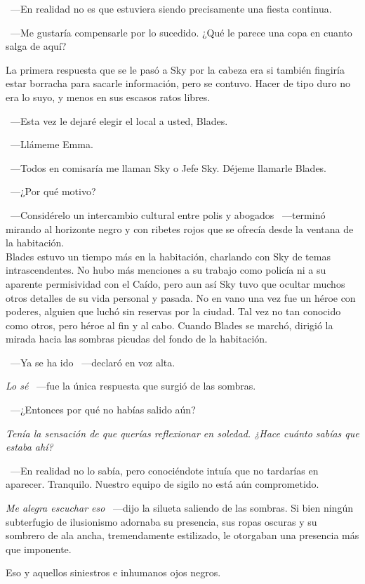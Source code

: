~---En realidad no es que estuviera siendo precisamente una fiesta continua.

~---Me gustaría compensarle por lo sucedido. ¿Qué le parece una copa en cuanto salga de aquí?

La primera respuesta que se le pasó a Sky por la cabeza era si también fingiría estar borracha para sacarle información, pero se contuvo. Hacer de tipo duro no era lo suyo, y menos en sus escasos ratos libres.

~---Esta vez le dejaré elegir el local a usted, Blades.

~---Llámeme Emma.

~---Todos en comisaría me llaman Sky o Jefe Sky. Déjeme llamarle Blades.

~---¿Por qué motivo?

~---Considérelo un intercambio cultural entre polis y abogados ~---terminó mirando al horizonte negro y con ribetes rojos que se ofrecía desde la ventana de la habitación.\\

\noindent{}Blades estuvo un tiempo más en la habitación, charlando con Sky de temas intrascendentes. No hubo más menciones a su trabajo como policía ni a su aparente permisividad con el Caído, pero aun así Sky tuvo que ocultar muchos otros detalles de su vida personal y pasada. No en vano una vez fue un héroe con poderes, alguien que luchó sin reservas por la ciudad. Tal vez no tan conocido como otros, pero héroe al fin y al cabo.
Cuando Blades se marchó, dirigió la mirada hacia las sombras picudas del fondo de la habitación.

~---Ya se ha ido ~---declaró en voz alta.

\emph{Lo sé} ~---fue la única respuesta que surgió de las sombras.

~---¿Entonces por qué no habías salido aún?

\emph{Tenía la sensación de que querías reflexionar en soledad. ¿Hace cuánto sabías que estaba ahí?}

~---En realidad no lo sabía, pero conociéndote intuía que no tardarías en aparecer. Tranquilo. Nuestro equipo de sigilo no está aún comprometido.

\emph{Me alegra escuchar eso} ~---dijo la silueta saliendo de las sombras. Si bien ningún subterfugio de ilusionismo adornaba su presencia, sus ropas oscuras y su sombrero de ala ancha, tremendamente estilizado, le otorgaban una presencia más que imponente.

Eso y aquellos siniestros e inhumanos ojos negros.

